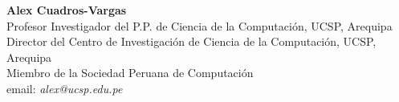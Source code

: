 \begin{center}
\textbf{Alex Cuadros-Vargas}\\
Profesor Investigador del P.P. de Ciencia de la Computación, UCSP, Arequipa\\
Director del Centro de Investigación de Ciencia de la Computación, UCSP, Arequipa\\
Miembro de la Sociedad Peruana de Computación\\
email: \textit{alex@ucsp.edu.pe}\\
\end{center}